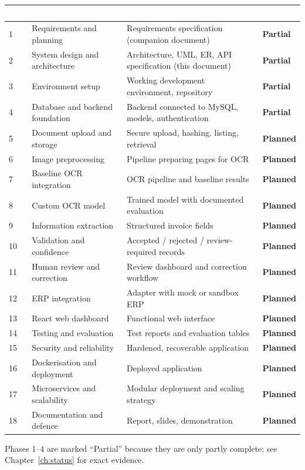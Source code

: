 \documentclass[11pt,a4paper]{report}
\newcommand{\hdr}[1]{\textcolor{white}{\sffamily\bfseries #1}}
\newcommand{\tblstart}{\rowcolors{2}{white}{rowgray}\arrayrulecolor{teal!60}}
\newcommand{\hdrrow}{\rowcolor{navy}}
\newcommand{\inprog}{\textcolor{amber!85!black}{\sffamily\bfseries Partial}}
\newcommand{\todo}{\textcolor{slate}{\sffamily\bfseries Planned}}
\begin{document}
{\tblstart\footnotesize
\begin{longtable}{L{0.8cm}L{3.5cm}L{7.6cm}L{2.2cm}}
\hdrrow \hdr{No.} & \hdr{Phase} & \hdr{Main deliverable} & \hdr{Status}\\  & Requirements and planning & Requirements specification (companion document) & \inprog\\
2 & System design and architecture & Architecture, UML, ER, API specification (this document) & \inprog\\
3 & Environment setup & Working development environment, repository & \inprog\\
4 & Database and backend foundation & Backend connected to MySQL, models, authentication & \inprog\\
5 & Document upload and storage & Secure upload, hashing, listing, retrieval & \todo\\
6 & Image preprocessing & Pipeline preparing pages for OCR & \todo\\
7 & Baseline OCR integration & OCR pipeline and baseline results & \todo\\
8 & Custom OCR model & Trained model with documented evaluation & \todo\\
9 & Information extraction & Structured invoice fields & \todo\\
10 & Validation and confidence & Accepted / rejected / review-required records & \todo\\
11 & Human review and correction & Review dashboard and correction workflow & \todo\\
12 & ERP integration & Adapter with mock or sandbox ERP & \todo\\
13 & React web dashboard & Functional web interface & \todo\\
14 & Testing and evaluation & Test reports and evaluation tables & \todo\\
15 & Security and reliability & Hardened, recoverable application & \todo\\
16 & Dockerisation and deployment & Deployed application & \todo\\
17 & Microservices and scalability & Modular deployment and scaling strategy & \todo\\
18 & Documentation and defence & Report, slides, demonstration & \todo\\
\hline
\end{longtable}}
\noindent Phases 1--4 are marked ``Partial'' because they are only partly complete; see Chapter~\ref{ch:status} for exact evidence.
\end{document}
